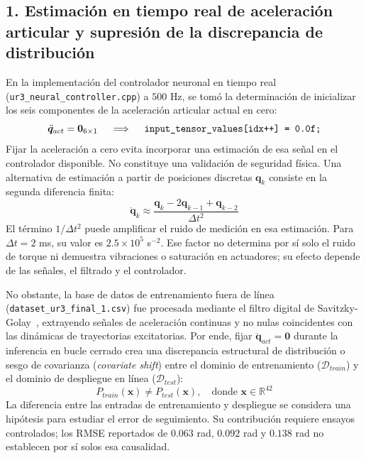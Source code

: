 \documentclass[12pt]{article}
\begin{document}
\subsection*{1. Estimación en tiempo real de aceleración articular y supresión de la discrepancia de distribución}

En la implementación del controlador neuronal en tiempo real (\texttt{ur3\_neural\_controller.cpp}) a $500\text{ Hz}$, se tomó la determinación de inicializar los seis componentes de la aceleración articular actual en cero:
\begin{equation}
    \ddot{\bm{q}}_{act} = \bm{0}_{6 \times 1} \quad \implies \quad \text{\texttt{input\_tensor\_values[idx++] = 0.0f;}}
\end{equation}
Fijar la aceleración a cero evita incorporar una estimación de esa señal en el controlador disponible. No constituye una validación de seguridad física. Una alternativa de estimación a partir de posiciones discretas $\bm{q}_k$ consiste en la segunda diferencia finita:
\begin{equation}
    \ddot{\bm{q}}_k \approx \frac{\bm{q}_k - 2\bm{q}_{k-1} + \bm{q}_{k-2}}{\Delta t^2}
\end{equation}
El término $1/\Delta t^2$ puede amplificar el ruido de medición en esa estimación. Para $\Delta t=2$ ms, su valor es $2.5\times10^5$ s$^{-2}$. Ese factor no determina por sí solo el ruido de torque ni demuestra vibraciones o saturación en actuadores; su efecto depende de las señales, el filtrado y el controlador.

No obstante, la base de datos de entrenamiento fuera de línea (\texttt{dataset\_ur3\_final\_1.csv}) fue procesada mediante el filtro digital de Savitzky-Golay~\cite{savitzky1964smoothing}, extrayendo señales de aceleración continuas y no nulas coincidentes con las dinámicas de trayectorias excitatorias. Por ende, fijar $\ddot{\bm{q}}_{act} = \bm{0}$ durante la inferencia en bucle cerrado crea una discrepancia estructural de distribución o sesgo de covarianza (\textit{covariate shift}) entre el dominio de entrenamiento ($\mathcal{D}_{train}$) y el dominio de despliegue en línea ($\mathcal{D}_{test}$):
\begin{equation}
    P_{train}(\bm{x}) \neq P_{test}(\bm{x}), \quad \text{donde } \bm{x} \in \mathbb{R}^{42}
\end{equation}
La diferencia entre las entradas de entrenamiento y despliegue se considera una hipótesis para estudiar el error de seguimiento. Su contribución requiere ensayos controlados; los RMSE reportados de $0.063$ rad, $0.092$ rad y $0.138$ rad no establecen por sí solos esa causalidad.
\end{document}

